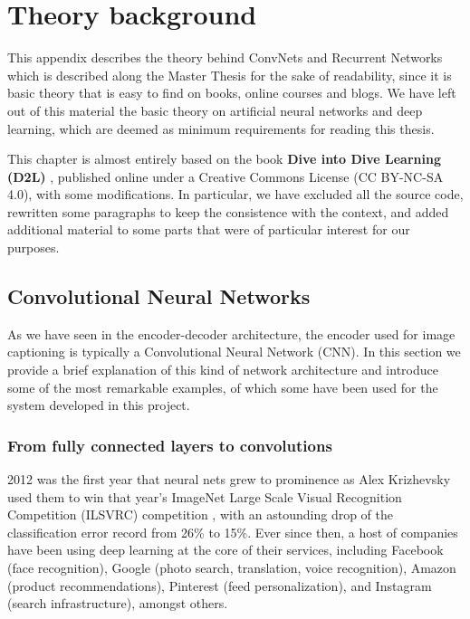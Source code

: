 \appendix
\chapter{Theory background}
\label{ch:theory}


This appendix describes the theory behind ConvNets and Recurrent Networks which is described along the Master Thesis for the sake of readability, since it is basic theory that is easy to find on books, online courses and blogs. We have left out of this material the basic theory on artificial neural networks and deep learning, which are deemed as minimum requirements for reading this thesis.

This chapter is almost entirely based on the book \textbf{Dive into Dive Learning (D2L)} \citep{Zhang2019d2l}, published online under a Creative Commons License (CC BY-NC-SA 4.0), with some modifications. In particular, we have excluded all the source code, rewritten some paragraphs to keep the consistence with the context, and added additional material to some parts that were of particular interest for our purposes.


\section{Convolutional Neural Networks}\label{sec:cnn}

As we have seen in the encoder-decoder architecture, the encoder used for image captioning is typically a Convolutional Neural Network (CNN). In this section we provide a brief explanation of this kind of network architecture and introduce some of the most remarkable examples, of which some have been used for the system developed in this project.

\subsection{From fully connected layers to convolutions}

2012 was the first year that neural nets grew to prominence as Alex Krizhevsky used them to win that year’s ImageNet Large Scale Visual Recognition Competition (ILSVRC) competition \citep{Krizhevsky2012}, with an astounding drop of the classification error record from 26\% to 15\%. Ever since then, a host of companies have been using deep learning at the core of their services, including Facebook (face recognition), Google (photo search, translation, voice recognition), Amazon (product recommendations), Pinterest (feed personalization), and Instagram (search infrastructure), amongst others.


